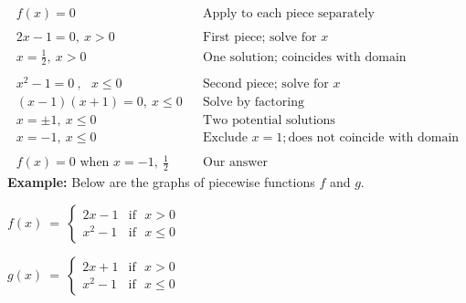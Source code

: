 \documentclass[12pt]{article}
\theoremstyle{definition}
\begin{document}
\begin{eqnarray*}
	f(x)=0~~~~~ & &\text{Apply~to~each~piece~separately}\\
&&\\
	2x-1=0,~x>0 & &\text{First~piece;~solve~for~}x\\
	x=\frac{1}{2},~x>0 & & \text{One~solution;~coincides~with~domain}\\
	& &\\
	x^2-1=0~,~~~x\leq 0 & &\text{Second~piece;~solve~for~}x\\
	(x-1)(x+1)=0,~x\leq 0 & & \text{Solve~by~factoring}\\
	x=\pm 1,~x\leq 0 & & \text{Two~potential~solutions}\\
	x=-1,~x\leq 0 & &\text{Exclude~} x=1; \text{does~not~coincide~with~domain}\\
	& &\\
	f(x)=0 \text{~when~} x=-1,~ \frac{1}{2} & & \text{Our~answer}
\end{eqnarray*}
\newpage
{\bf Example:}  Below are the graphs of piecewise functions $f$ and $g$.
\begin{center}
\begin{multicols}{2}
$f(x)~=~
	\begin{cases} 
      2x-1 & \text{if~~} x> 0\\
			x^2-1 & \text{if~~} x\leq 0
  \end{cases}$

$g(x)~=~
	\begin{cases} 
      2x+1 & \text{if~~} x> 0\\
			x^2-1 & \text{if~~} x\leq 0
  \end{cases}$
\end{multicols}
\end{center}
\end{document}
